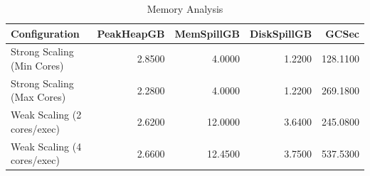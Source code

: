 \begin{table}
\caption{Memory Analysis}
\label{tab:table5_memory_analysis}
\begin{tabular}{lrrrr}
\toprule
Configuration & PeakHeapGB & MemSpillGB & DiskSpillGB & GCSec \\
\midrule
Strong Scaling (Min Cores) & 2.8500 & 4.0000 & 1.2200 & 128.1100 \\
Strong Scaling (Max Cores) & 2.2800 & 4.0000 & 1.2200 & 269.1800 \\
Weak Scaling (2 cores/exec) & 2.6200 & 12.0000 & 3.6400 & 245.0800 \\
Weak Scaling (4 cores/exec) & 2.6600 & 12.4500 & 3.7500 & 537.5300 \\
\bottomrule
\end{tabular}
\end{table}
